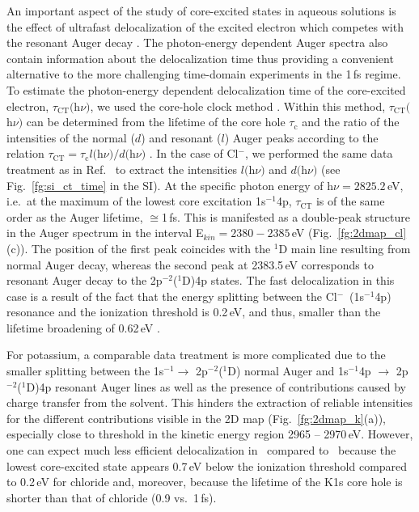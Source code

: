 {\color{blue}
An important aspect of the study of core-excited states in aqueous solutions is the effect of ultrafast delocalization of the excited electron which competes with the resonant Auger decay \citep{Nordlund07:217406,ottosson12:1}. The photon-energy dependent Auger spectra also contain information about the delocalization time thus providing a convenient alternative to the more challenging time-domain experiments in the 1\,fs regime. To estimate the photon-energy dependent delocalization time of the core-excited electron, $\tau_{\text{CT}} ($h$\nu)$, we used the core-hole clock method \cite{bjorneholm92:1892,karis96:1380,wurth00:141,bruehwiler02:703,foehlisch05:373}.
Within this method, $\tau_{\text{CT}} ($h$\nu)$ can be determined from the lifetime of the core hole $\tau_{\text{c}}$ and the ratio of the intensities of the normal ($d$) and resonant ($l$) Auger peaks according to the relation $\tau_{\text{CT}} = \tau_{\text{c}}l($h$\nu)/d($h$\nu)$ \citep{bjorneholm92:1892,karis96:1380,wurth00:141,bruehwiler02:703,foehlisch05:373}. In the case of Cl$^{-}$, we performed the same data treatment as in Ref.\ \cite{ceolin15:022502} to extract the intensities $l($h$\nu)$ and $d($h$\nu)$ (see Fig.\ \ref{fg:si_ct_time} in the SI). At the specific photon energy of h$\nu = 2825.2$\,eV, i.e.\ at the maximum of the lowest core excitation 1s$^{-1}$4p, $\tau_{\text{CT}}$ is of the same order as the Auger lifetime, $\cong$1\,fs. This is manifested as a double-peak structure in the Auger spectrum in the interval E$_{kin} = 2380 - 2385$\,eV (Fig.\ \ref{fg:2dmap_cl}(c)). The position of the first peak coincides with the $^1$D main line resulting from normal Auger decay, whereas the second peak at 2383.5\,eV corresponds to resonant Auger decay to the 2p$^{-2}$($^1$D)4p states. The fast delocalization in this case is a result of the fact that the energy splitting between the Cl$^{-}$~(1s$^{-1}$4p) resonance and the ionization threshold is 0.2\,eV, and thus, smaller than the lifetime broadening of 0.62\,eV \citep{ceolin17:263003}.


For potassium, a comparable data treatment is more complicated due to the smaller splitting between the 1s$^{-1} \rightarrow$ 2p$^{-2}$($^1$D) normal Auger and  1s$^{-1}$4p $ \rightarrow$ 2p$^{-2}$($^1$D)4p resonant Auger lines as well as the presence of contributions caused by charge transfer from the solvent. This hinders the extraction of reliable intensities for the different contributions visible in the 2D map (Fig.\ \ref{fg:2dmap_k}(a)), especially close to threshold in the kinetic energy region 2965 -- 2970\,eV. However, one can expect much less efficient delocalization in \ki~compared to \cli~because the lowest core-excited state appears 0.7\,eV below the ionization threshold compared to 0.2\,eV for chloride and, moreover, because the lifetime of the K1s core hole is shorter than that of chloride (0.9 vs.\ 1\,fs).}


